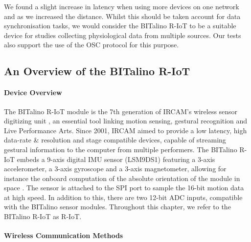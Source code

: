 We found a slight increase in latency when using more devices on one network and as we increased the distance. Whilst this should be taken account for data synchronisation tasks, we would consider the BITalino R-IoT to be a suitable device for studies collecting physiological data from multiple sources. Our tests also support the use of the OSC protocol for this purpose.

\subsection{An Overview of the BITalino R-IoT}
\label{subsec:riot}

\paragraph{Device Overview}

The BITalino R-IoT module is the 7th generation of IRCAM's wireless sensor digitizing unit \cite{noauthor_bitalino_nodate}, an essential tool linking motion sensing, gestural recognition and Live Performance Arts. Since 2001, IRCAM aimed to provide a low latency, high data-rate \& resolution and stage compatible devices, capable of streaming gestural information to the computer from multiple performers. The BITalino R-IoT embeds a 9-axis digital IMU sensor (LSM9DS1) featuring a 3-axis accelerometer, a 3-axis gyroscope and a 3-axis magnetometer, allowing for instance the onboard computation of the absolute orientation of the module in space \cite{matzka_developing_2019}. The sensor is attached to the SPI port to sample the 16-bit motion data at high speed. In addition to this, there are two 12-bit ADC inputs, compatible with the BITalino sensor modules. Throughout this chapter, we refer to the BITalino R-IoT as R-IoT. 

\paragraph{Wireless Communication Methods}


